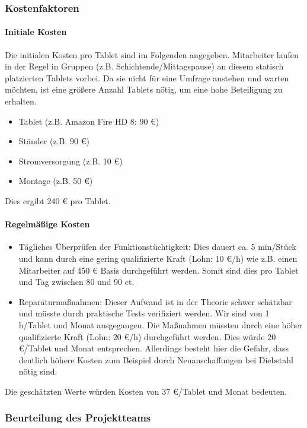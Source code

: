 \subsubsection{Kostenfaktoren}

\paragraph{Initiale Kosten}
Die initialen Kosten pro Tablet sind im Folgenden angegeben. Mitarbeiter laufen in der Regel in Gruppen (z.B. Schichtende/Mittagspause) an diesem statisch platzierten Tablets vorbei. Da sie nicht für eine Umfrage anstehen und warten möchten, ist eine größere Anzahl Tablets nötig, um eine hohe Beteiligung zu erhalten.

\begin{itemize}
\item Tablet (z.B. Amazon Fire HD 8: 90 €)
\item Ständer (z.B. 90 €)
\item Stromversorgung (z.B. 10 €)
\item Montage (z.B. 50 €)
\end{itemize}

Dies ergibt 240 € pro Tablet.

\paragraph{Regelmäßige Kosten}
\begin{itemize}
\item Tägliches Überprüfen der Funktionstüchtigkeit: Dies dauert ca. 5 min/Stück und kann durch eine gering qualifizierte Kraft (Lohn: 10 €/h) wie z.B. einen Mitarbeiter auf 450 € Basis durchgeführt werden. Somit sind dies pro Tablet und Tag zwischen 80 und 90 ct.
\item Reparaturmaßnahmen: Dieser Aufwand ist in der Theorie schwer schätzbar und müsste durch praktische Tests verifiziert werden. Wir sind von 1 h/Tablet und Monat ausgegangen. Die Maßnahmen müssten durch eine höher qualifizierte Kraft (Lohn: 20 €/h) durchgeführt werden. Dies würde 20 €/Tablet und Monat entsprechen. Allerdings besteht hier die Gefahr, dass deutlich höhere Kosten zum Beispiel durch Neuanschaffungen bei Diebstahl nötig sind.
\end{itemize}

Die geschätzten Werte würden Kosten von 37 €/Tablet und Monat bedeuten.

\subsubsection{Beurteilung des Projektteams}
